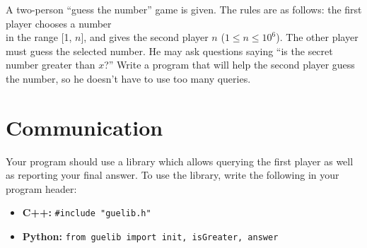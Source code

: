 \documentclass{spiral}
\begin{document}
    \makeheader

    \noindent A two-person ``guess the number'' game is given.
    The rules are as follows:
    the first player chooses a number\\in the range [1, $n$],
    and gives the second player $n$ ($1 \leq n \leq 10^6$).
    The other player must guess the selected number. 
    He may ask questions saying ``is the secret number greater than $x$?''
    Write a program that will help the second player guess the number,
    so he doesn't have to use too many queries.

\section{Communication}

    Your program should use a library which allows querying the first player
    as well as reporting your final answer.
    To use the library, write the following in your program header:
    \begin{itemize}
        \item \textbf{C++:}
            \verb|#include "guelib.h"|

        \item \textbf{Python:}
            \texttt{from guelib import init, isGreater, answer}
    \end{itemize}
\end{document}

